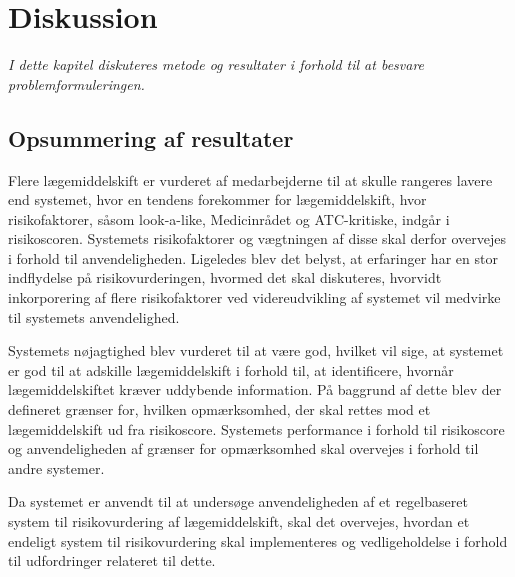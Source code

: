 
\chapter{Diskussion}
\textit{I dette kapitel diskuteres metode og resultater i forhold til at besvare problemformuleringen.}


\section{Opsummering af resultater}
Flere lægemiddelskift er vurderet af medarbejderne til at skulle rangeres lavere end systemet, hvor en tendens forekommer for lægemiddelskift, hvor risikofaktorer, såsom look-a-like, Medicinrådet og ATC-kritiske, indgår i risikoscoren. Systemets risikofaktorer og vægtningen af disse skal derfor overvejes i forhold til anvendeligheden. Ligeledes blev det belyst, at erfaringer har en stor indflydelse på risikovurderingen, hvormed det skal diskuteres, hvorvidt inkorporering af flere risikofaktorer ved videreudvikling af systemet vil medvirke til systemets anvendelighed.

Systemets nøjagtighed blev vurderet til at være  god, hvilket vil sige, at systemet er god til at adskille lægemiddelskift i forhold til, at identificere, hvornår lægemiddelskiftet kræver uddybende information. På baggrund af dette blev der defineret grænser for, hvilken opmærksomhed, der skal rettes mod et lægemiddelskift ud fra risikoscore. Systemets performance i forhold til risikoscore og anvendeligheden af grænser for opmærksomhed skal overvejes i forhold til andre systemer. 

Da systemet er anvendt til at undersøge anvendeligheden af et regelbaseret system til risikovurdering af lægemiddelskift, skal det overvejes, hvordan et endeligt system til risikovurdering skal implementeres og vedligeholdelse i forhold til udfordringer relateret til dette. 



